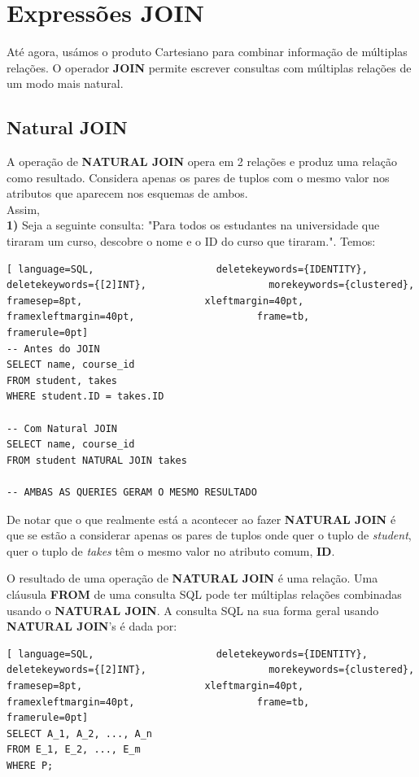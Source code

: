 \documentclass[oneside]{book}
\theoremstyle{definition}
\begin{document}
\section{Expressões JOIN}
Até agora, usámos o produto Cartesiano para combinar informação de múltiplas relações. O operador \textbf{JOIN} permite escrever consultas com múltiplas relações de um modo mais natural.

\subsection{Natural JOIN} 
A operação de \textbf{NATURAL JOIN} opera em 2 relações e produz uma relação como resultado. Considera apenas os pares de tuplos com o mesmo valor nos atributos que aparecem nos esquemas de ambos. \\
Assim, \\
\textbf{1)} Seja a seguinte consulta: "Para todos os estudantes na universidade que tiraram um curso, descobre o nome e o ID do curso que tiraram.". Temos:
\begin{lstlisting}[ language=SQL,                     deletekeywords={IDENTITY},                     deletekeywords={[2]INT},                     morekeywords={clustered},                     framesep=8pt,                     xleftmargin=40pt,                     framexleftmargin=40pt,                     frame=tb,                     framerule=0pt]
-- Antes do JOIN
SELECT name, course_id
FROM student, takes
WHERE student.ID = takes.ID

-- Com Natural JOIN
SELECT name, course_id
FROM student NATURAL JOIN takes

-- AMBAS AS QUERIES GERAM O MESMO RESULTADO
\end{lstlisting}

De notar que o que realmente está a acontecer ao fazer \textbf{NATURAL JOIN} é que se estão a considerar apenas os pares de tuplos onde quer o tuplo de \textit{student}, quer o tuplo de \textit{takes} têm o mesmo valor no atributo comum, \textbf{ID}.

O resultado de uma operação de \textbf{NATURAL JOIN} é uma relação. Uma cláusula \textbf{FROM} de uma consulta SQL pode ter múltiplas relações combinadas usando o \textbf{NATURAL JOIN}. A consulta SQL na sua forma geral usando \textbf{NATURAL JOIN}'s é dada por:
\begin{lstlisting}[ language=SQL,                     deletekeywords={IDENTITY},                     deletekeywords={[2]INT},                     morekeywords={clustered},                     framesep=8pt,                     xleftmargin=40pt,                     framexleftmargin=40pt,                     frame=tb,                     framerule=0pt]
SELECT A_1, A_2, ..., A_n
FROM E_1, E_2, ..., E_m
WHERE P;
\end{lstlisting}
\end{document}
